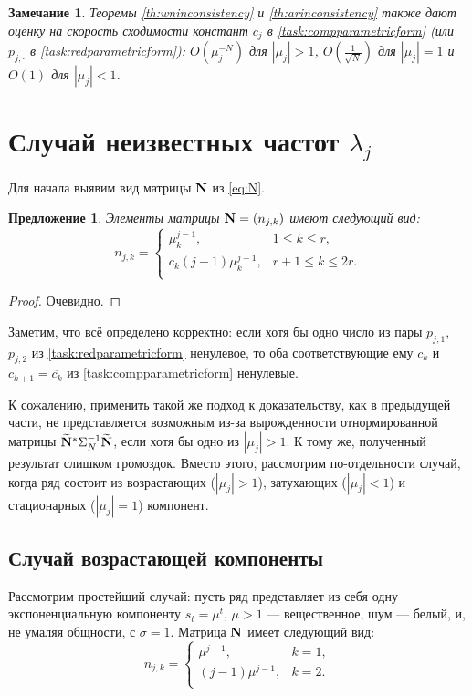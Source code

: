 \documentclass[12pt,a4paper]{article}
\newtheorem{proposition}{Предложение}
\newtheorem{remark}{Замечание}
\begin{document}
\begin{remark}
	Теоремы \ref{th:wninconsistency} и \ref{th:arinconsistency} также дают оценку на скорость сходимости констант $c_j$ в \eqref{task:compparametricform} (или $p_{j, \cdot}$ в \eqref{task:redparametricform}): $O(\mu_j^{-N})$ для $|\mu_j| > 1$, $O(\frac{1}{\sqrt{N}})$ для $|\mu_j| = 1$ и $O(1)$ для $|\mu_j| < 1$.
\end{remark}

\section{Случай неизвестных частот $\lambda_j$}
Для начала выявим вид матрицы $\mathbf{N}$ из \eqref{eq:N}.

\begin{proposition}
	Элементы матрицы $\mathbf{N} = (n_{j, k})$ имеют следующий вид:
	\begin{equation*}
	n_{j, k} = \begin{cases}
	\mu_k^{j-1}, & 1 \le k \le r, \\
	c_k (j - 1) \mu_k^{j-1}, & r + 1 \le k \le 2r. \\	
	\end{cases}
	\end{equation*}
\end{proposition}
\begin{proof}
	Очевидно.
\end{proof}

Заметим, что всё определено корректно: если хотя бы одно число из пары $p_{j, 1}$, $p_{j, 2}$ из \eqref{task:redparametricform} ненулевое, то оба соответствующие ему $c_k$ и $c_{k+1} = \overline{c_k}$ из \eqref{task:compparametricform} ненулевые.

К сожалению, применить такой же подход к доказательству, как в предыдущей части, не представляется возможным из-за вырожденности отнормированной матрицы $\widetilde {\mathbf{N}}^* \Sigma_N^{-1} \widetilde {\mathbf{N}}$, если хотя бы одно из $|\mu_j|>1$. К тому же, полученный результат слишком громоздок. Вместо этого, рассмотрим по-отдельности случай, когда ряд состоит из возрастающих ($|\mu_j| > 1$), затухающих ($|\mu_j| < 1$) и стационарных ($|\mu_j| = 1$) компонент.

\subsection{Случай возрастающей компоненты}
Рассмотрим простейший случай: пусть ряд представляет из себя одну экспоненциальную компоненту $s_t = \mu^t$, $\mu>1$ --- вещественное, шум --- белый, и, не умаляя общности, с $\sigma = 1$. Матрица $\mathbf{N}$ имеет следующий вид:
\begin{equation*}
	n_{j, k} = \begin{cases}
	\mu^{j-1}, & k = 1, \\
	(j - 1) \mu^{j-1}, & k = 2. \\	
	\end{cases}
\end{equation*}
\end{document}
